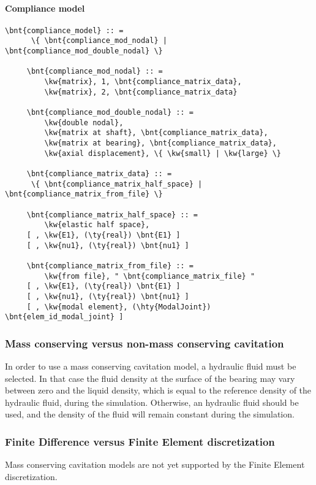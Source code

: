 \paragraph{Compliance model}
\begin{Verbatim}[commandchars=\\\{\}]
     \bnt{compliance_model} :: =
      \{ \bnt{compliance_mod_nodal} | \bnt{compliance_mod_double_nodal} \}

     \bnt{compliance_mod_nodal} :: =
         \kw{matrix}, 1, \bnt{compliance_matrix_data},
         \kw{matrix}, 2, \bnt{compliance_matrix_data}

     \bnt{compliance_mod_double_nodal} :: =
         \kw{double nodal},
         \kw{matrix at shaft}, \bnt{compliance_matrix_data},
         \kw{matrix at bearing}, \bnt{compliance_matrix_data},
         \kw{axial displacement}, \{ \kw{small} | \kw{large} \}

     \bnt{compliance_matrix_data} :: =
      \{ \bnt{compliance_matrix_half_space} | \bnt{compliance_matrix_from_file} \}

     \bnt{compliance_matrix_half_space} :: =
         \kw{elastic half space},
     [ , \kw{E1}, (\ty{real}) \bnt{E1} ]
     [ , \kw{nu1}, (\ty{real}) \bnt{nu1} ]

     \bnt{compliance_matrix_from_file} :: =
         \kw{from file}, " \bnt{compliance_matrix_file} "
     [ , \kw{E1}, (\ty{real}) \bnt{E1} ]
     [ , \kw{nu1}, (\ty{real}) \bnt{nu1} ]
     [ , \kw{modal element}, (\hty{ModalJoint}) \bnt{elem_id_modal_joint} ]
\end{Verbatim}

\subsubsection{Mass conserving versus non-mass conserving cavitation}
In order to use a mass conserving cavitation model, a  hydraulic fluid must be selected. In that case the fluid density at the surface of the bearing may vary between zero and the liquid density, which is equal to the reference density of the hydraulic fluid, during the simulation. Otherwise, an  hydraulic fluid should be used, and the density of the fluid will remain constant during the simulation.
\subsubsection{Finite Difference versus Finite Element discretization}
Mass conserving cavitation models are not yet supported by the Finite Element discretization.
